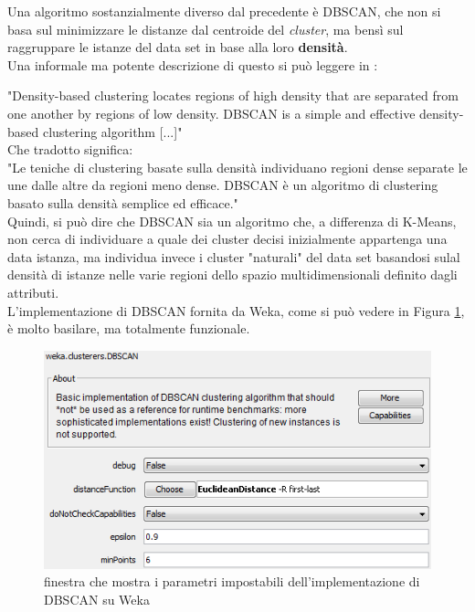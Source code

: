         Una algoritmo sostanzialmente diverso dal precedente è DBSCAN, che non si basa sul minimizzare le distanze dal centroide del \textit{cluster}, ma bensì sul raggruppare le istanze del data set in base alla loro \textbf{densità}. \\

        Una informale ma potente descrizione di questo si può leggere in \cite{dispense}:

        "Density-based clustering locates regions of high density that are separated from one another by regions of low density. DBSCAN is a simple and effective density-based clustering algorithm [...]"\\

        Che tradotto significa:\\

        "Le teniche di clustering basate sulla densità individuano regioni dense separate le une dalle altre da regioni meno dense. DBSCAN è un algoritmo di clustering basato sulla densità semplice ed efficace."\\

        Quindi, si può dire che DBSCAN sia un algoritmo che, a differenza di K-Means, non cerca di individuare a quale dei cluster decisi inizialmente appartenga una data istanza, ma individua invece i cluster "naturali" del data set basandosi sulal densità di istanze nelle varie regioni dello spazio multidimensionali definito dagli attributi. \\

        L'implementazione di DBSCAN fornita da Weka, come si può vedere in Figura \ref{dbscan_weka}, è molto basilare, ma totalmente funzionale.

        \begin{figure}
            \centering
            \caption{finestra che mostra i parametri impostabili dell'implementazione di DBSCAN su Weka}
            \label{dbscan_weka}
            \includegraphics[scale=0.70]{img/dbscan_weka.png}
        \end{figure}

